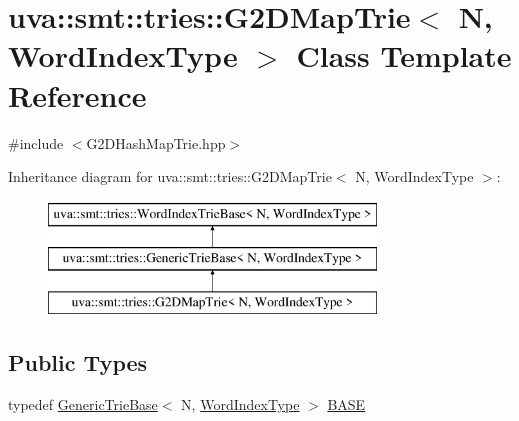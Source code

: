 \hypertarget{classuva_1_1smt_1_1tries_1_1_g2_d_map_trie}{}\section{uva\+:\+:smt\+:\+:tries\+:\+:G2\+D\+Map\+Trie$<$ N, Word\+Index\+Type $>$ Class Template Reference}
\label{classuva_1_1smt_1_1tries_1_1_g2_d_map_trie}


{\ttfamily \#include $<$G2\+D\+Hash\+Map\+Trie.\+hpp$>$}

Inheritance diagram for uva\+:\+:smt\+:\+:tries\+:\+:G2\+D\+Map\+Trie$<$ N, Word\+Index\+Type $>$\+:\begin{figure}[H]
\begin{center}
\leavevmode
\includegraphics[height=3.000000cm]{classuva_1_1smt_1_1tries_1_1_g2_d_map_trie}
\end{center}
\end{figure}
\subsection*{Public Types}
\begin{DoxyCompactItemize}
\item 
typedef \hyperlink{classuva_1_1smt_1_1tries_1_1_generic_trie_base}{Generic\+Trie\+Base}$<$ N, \hyperlink{classuva_1_1smt_1_1tries_1_1_word_index_trie_base_a30c4fffe3a3423c87b229b66340dd2f8}{Word\+Index\+Type} $>$ \hyperlink{classuva_1_1smt_1_1tries_1_1_g2_d_map_trie_ac292db3e38827a5eea2507b7bb548b0f}{B\+A\+S\+E}
\end{DoxyCompactItemize}
